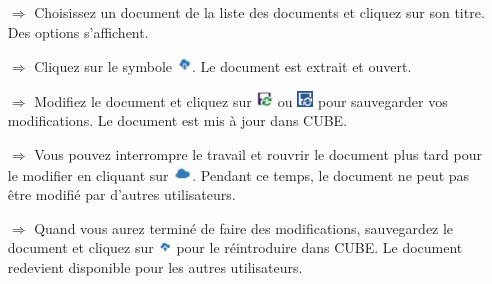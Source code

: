 \documentclass{article}
\begin{document}
\begin{multicols}{2}

\begin{tcolorbox}[colback=blue!5,colframe=blue!40!black,title=Extraire des documents pour les modifier en ligne]
\begin{itemize}
  \item[$\Longrightarrow$] Choisissez un document de la liste des documents et cliquez sur son titre. Des options s'affichent.
  \item[$\Longrightarrow$] Cliquez sur le symbole \includegraphics[height=12pt]{Icons/Auschecken.jpg}. Le document est extrait et ouvert.
  \item[$\Longrightarrow$] Modifiez le document et cliquez sur \includegraphics[height=12pt]{Icons/Sync2013.jpg} ou \includegraphics[height=12pt]{Icons/Sync2016.jpg} pour sauvegarder vos modifications. Le document est mis à jour dans CUBE.
  \item[$\Longrightarrow$] Vous pouvez interrompre le travail et rouvrir le document plus tard pour le modifier en cliquant sur \includegraphics[height=12pt]{Icons/Wolke_blauklein.jpg}. Pendant ce temps, le document ne peut pas être modifié par d'autres utilisateurs.
	\item[$\Longrightarrow$] Quand vous aurez terminé de faire des modifications, sauvegardez le document et cliquez sur \includegraphics[height=10pt]{Icons/Einchecken.jpg} pour le réintroduire dans CUBE. Le document redevient disponible pour les autres utilisateurs.
\end{itemize}
\end{tcolorbox}



\end{multicols}
\end{document}
